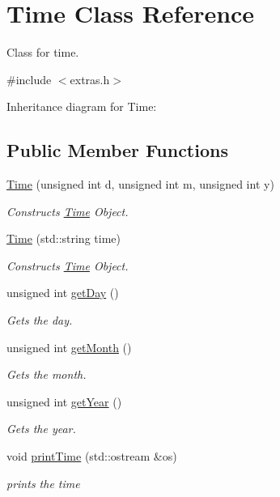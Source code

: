 \hypertarget{classTime}{}\section{Time Class Reference}
\label{classTime}


Class for time.  




{\ttfamily \#include $<$extras.\+h$>$}



Inheritance diagram for Time\+:
\subsection*{Public Member Functions}
\begin{DoxyCompactItemize}
\item 
\hyperlink{classTime_a8cc1b9240e826d14fc991a11bee7cb1b}{Time} (unsigned int d, unsigned int m, unsigned int y)
\begin{DoxyCompactList}\small\item\em Constructs \hyperlink{classTime}{Time} Object. \end{DoxyCompactList}\item 
\hyperlink{classTime_a15f171401599a9a058e89e6cf3244f2b}{Time} (std\+::string time)
\begin{DoxyCompactList}\small\item\em Constructs \hyperlink{classTime}{Time} Object. \end{DoxyCompactList}\item 
unsigned int \hyperlink{classTime_abdccc37217b520155a67a1d732014f1a}{get\+Day} ()
\begin{DoxyCompactList}\small\item\em Gets the day. \end{DoxyCompactList}\item 
unsigned int \hyperlink{classTime_a22fd86b14d3b067cf1447fd9ca5caf6f}{get\+Month} ()
\begin{DoxyCompactList}\small\item\em Gets the month. \end{DoxyCompactList}\item 
unsigned int \hyperlink{classTime_ade4d01d38041bb86a2e1ded9fd3cd28e}{get\+Year} ()
\begin{DoxyCompactList}\small\item\em Gets the year. \end{DoxyCompactList}\item 
void \hyperlink{classTime_a79d96e150ff808580fdf43932897130d}{print\+Time} (std\+::ostream \&os)
\begin{DoxyCompactList}\small\item\em prints the time \end{DoxyCompactList}\end{DoxyCompactItemize}
